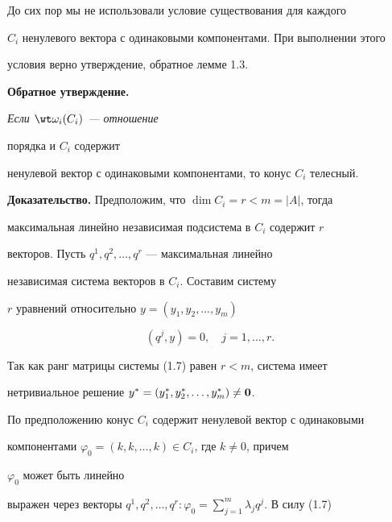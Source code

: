  


\begin{notenonum} 


До сих пор мы не использовали условие существования для каждого 


$C_i$ ненулевого вектора с одинаковыми компонентами. При выполнении этого 


условия верно утверждение, обратное лемме 1.3. 


\end{notenonum} 


 


{\bf Обратное утверждение.} {\it Если $\wt\omega_i(C_i)$ --- отношение 


порядка и $C_i$ содержит 


ненулевой вектор с одинаковыми компонентами, то конус $C_i$ телесный.} 


\medskip 


 


{\bf Доказательство.} Предположим, что $\dim C_i=r<m=|A|$, тогда 


максимальная линейно независимая подсистема в $C_i$ содержит $r$ 


векторов. Пусть $q^1,q^2,\dotsc,q^r$ --- максимальная линейно 


независимая система векторов в $C_i$. Составим систему 


$r$ уравнений относительно $y=(y_1,y_2,\dotsc,y_m)$ 


\begin{equation} 


(q^j,y)=0,\quad j=1,\dotsc,r. 


\end{equation} 


 


Так как ранг матрицы системы (1.7) равен $r<m$, система имеет 


нетривиальное решение $y^*=(y^*_1,y^*_2,\dotsc,y^*_m)\ne\bold 0$. 


По предположению конус $C_i$ содержит ненулевой вектор с одинаковыми 


компонентами $\varphi_0=(k,k,\dotsc,k)\in C_i$, где $k\ne0$, причем 


$\varphi_0$ может быть линейно 


выражен через векторы $q^1,q^2,\dotsc,q^r:\varphi_0= 


\sum\limits^m_{j=1}\lambda_j q^j$. В силу (1.7) 


